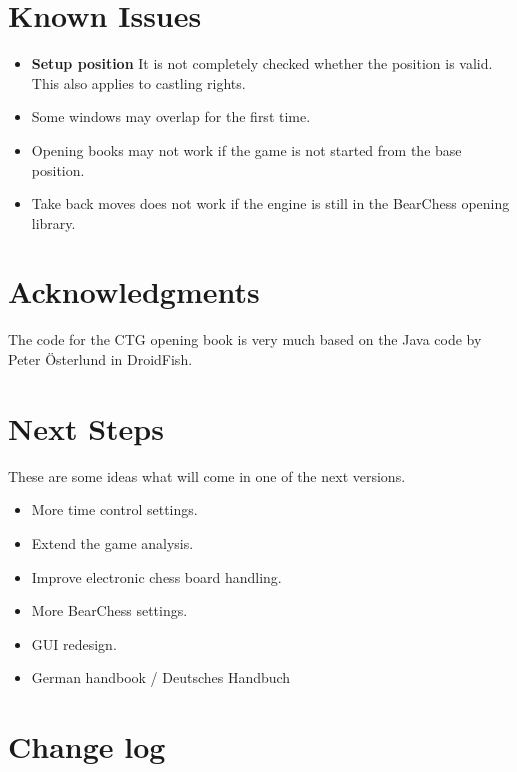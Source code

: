\documentclass[11pt,a4paper]{article}
\begin{document}
\section{Known Issues}
\begin{itemize}
    \item \textbf{Setup position} It is not completely checked whether the position is valid. This also applies to castling rights.
	\item Some windows may overlap for the first time.	
	\item Opening books may not work if the game is not started from the base position.	
	\item Take back moves does not work if the engine is still in the BearChess opening library.
\end{itemize}

\section{Acknowledgments}
The code for the CTG opening book is very much based on the Java code by Peter Österlund in DroidFish.

\section{Next Steps}

These are some ideas what will come in one of the next versions.

\begin{itemize}			
	    \item More time control settings.
		\item Extend the game analysis.
		\item Improve electronic chess board handling.  	    
    	\item More BearChess settings.
   		\item GUI redesign.
   		\item German handbook / Deutsches Handbuch
\end{itemize} 

\pagebreak

\listoffigures

\pagebreak

\section{Change log}
\end{document}
